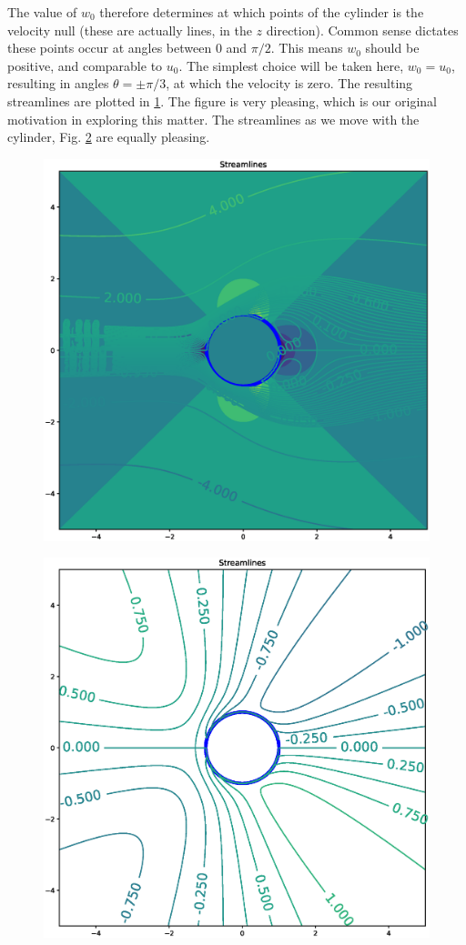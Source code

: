The value of $w_0$ therefore determines at which points of the
cylinder is the velocity null (these are actually lines, in the $z$
direction). Common sense dictates these points occur at angles between
$0$ and $\pi/2$. This means $w_0$ should be positive, and comparable
to $u_0$. The simplest choice will be taken here, $w_0 = u_0$,
resulting in angles $\theta=\pm \pi/3$, at which the velocity is zero.
The resulting streamlines are plotted in
\ref{fig:creeping_flow_past_cyl}. The figure is very pleasing, which
is our original motivation in exploring this matter. The streamlines
as we move with the cylinder,
Fig. \ref{fig:creeping_flow_past_cyl_moving} are equally pleasing.

\begin{figure}
  \centering
  \includegraphics[width=0.8\linewidth]{figures/creeping_flow_past_cyl_slip}
  \caption{\label{fig:creeping_flow_past_cyl}}
\end{figure}


\begin{figure}
  \centering
  \includegraphics[width=0.8\linewidth]{figures/creeping_flow_past_cyl_slip_moving}
  \caption{\label{fig:creeping_flow_past_cyl_moving}}
\end{figure}


